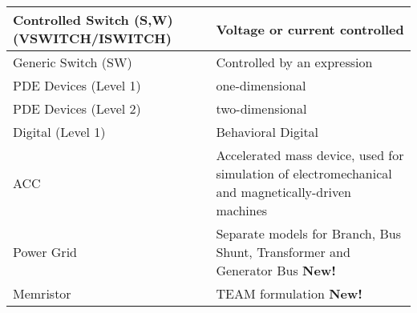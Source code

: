 \begin{longtable}[h] {>{\raggedright\small}m{2in}|>{\raggedright\let\\\tabularnewline\small}m{3.5in}}
    Controlled Switch (S,W) (VSWITCH/ISWITCH) & Voltage or current controlled\\ \hline

    Generic Switch (SW) & Controlled by an expression\\ \hline

    PDE Devices (Level 1) & one-dimensional\\ \hline

    PDE Devices (Level 2) & two-dimensional\\ \hline

    Digital (Level 1)  & Behavioral Digital \\ \hline

    ACC & Accelerated mass device, used for simulation of electromechanical and magnetically-driven machines \\ \hline

    Power Grid & Separate models for Branch, Bus Shunt, Transformer and Generator 
                 Bus {\color{red}\textbf{New!}}\\ \hline

    Memristor & TEAM formulation {\color{red}\textbf{New!}}\\ \hline

\end{longtable}

